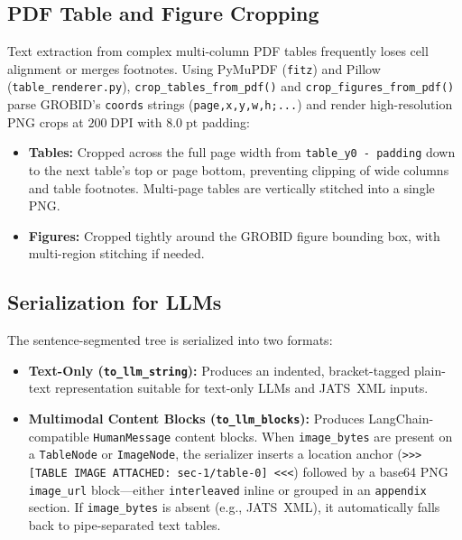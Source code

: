 \subsection{PDF Table and Figure Cropping}
Text extraction from complex multi-column PDF tables frequently loses cell alignment or merges footnotes. Using PyMuPDF (\texttt{fitz}) and Pillow (\texttt{table\_renderer.py}), \texttt{crop\_tables\_from\_pdf()} and \texttt{crop\_figures\_from\_pdf()} parse GROBID's \texttt{coords} strings (\texttt{page,x,y,w,h;...}) and render high-resolution PNG crops at $200\;\text{DPI}$ with $8.0\;\text{pt}$ padding:
\begin{itemize}
    \item \textbf{Tables:} Cropped across the full page width from \texttt{table\_y0 - padding} down to the next table's top or page bottom, preventing clipping of wide columns and table footnotes. Multi-page tables are vertically stitched into a single PNG.
    \item \textbf{Figures:} Cropped tightly around the GROBID figure bounding box, with multi-region stitching if needed.
\end{itemize}

\subsection{Serialization for LLMs}
The sentence-segmented tree is serialized into two formats:
\begin{itemize}
    \item \textbf{Text-Only (\texttt{to\_llm\_string}):} Produces an indented, bracket-tagged plain-text representation suitable for text-only LLMs and JATS~XML inputs.
    \item \textbf{Multimodal Content Blocks (\texttt{to\_llm\_blocks}):} Produces LangChain-compatible \texttt{HumanMessage} content blocks. When \texttt{image\_bytes} are present on a \texttt{TableNode} or \texttt{ImageNode}, the serializer inserts a location anchor (\texttt{>>> [TABLE IMAGE ATTACHED: sec-1/table-0] <<<}) followed by a base64 PNG \texttt{image\_url} block---either \texttt{interleaved} inline or grouped in an \texttt{appendix} section. If \texttt{image\_bytes} is absent (e.g., JATS~XML), it automatically falls back to pipe-separated text tables.
\end{itemize}
